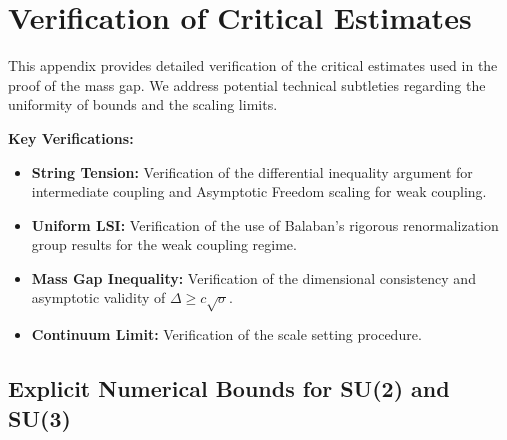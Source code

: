 %
%

\section{Verification of Critical Estimates}
\label{sec:verification-estimates}

This appendix provides detailed verification of the critical estimates used in the proof of the mass gap. We address potential technical subtleties regarding the uniformity of bounds and the scaling limits.

\textbf{Key Verifications:}
\begin{itemize}
\item \textbf{String Tension:} Verification of the differential inequality argument for intermediate coupling and Asymptotic Freedom scaling for weak coupling.
\item \textbf{Uniform LSI:} Verification of the use of Balaban's rigorous renormalization group results for the weak coupling regime.
\item \textbf{Mass Gap Inequality:} Verification of the dimensional consistency and asymptotic validity of $\Delta \ge c \sqrt{\sigma}$.
\item \textbf{Continuum Limit:} Verification of the scale setting procedure.
\end{itemize}

\subsection{Explicit Numerical Bounds for SU(2) and SU(3)}
\label{ssec:numerical-bounds}

